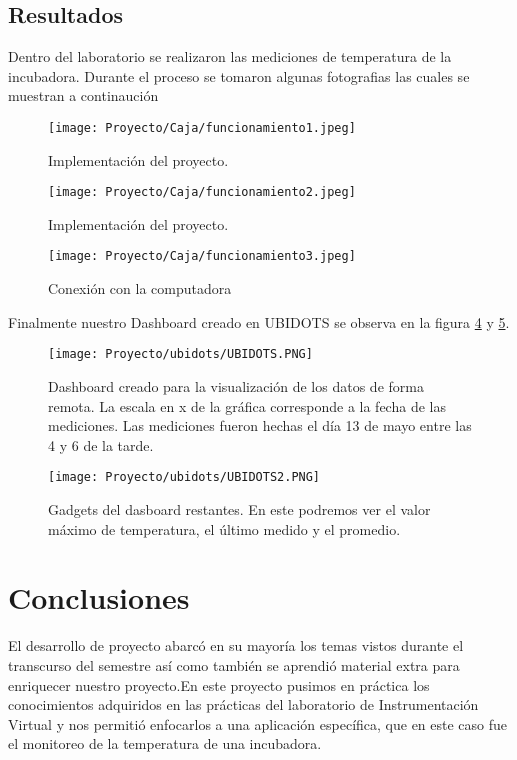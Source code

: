 \subsection{Resultados}

Dentro del laboratorio se realizaron las mediciones de temperatura de la incubadora. Durante el proceso se tomaron algunas fotografias las cuales se muestran  a continaución

\begin{figure}[!h]
\centering
\texttt{[image: Proyecto/Caja/funcionamiento1.jpeg]}
\caption{Implementación del proyecto.}
\label{f1}
\end{figure}


\begin{figure}[!h]
\centering
\texttt{[image: Proyecto/Caja/funcionamiento2.jpeg]}
\caption{Implementación del proyecto.}
\label{f1}
\end{figure}


\begin{figure}[!h]
\centering
\texttt{[image: Proyecto/Caja/funcionamiento3.jpeg]}
\caption{Conexión con la computadora }
\label{f1}
\end{figure}

\clearpage

Finalmente nuestro Dashboard creado en UBIDOTS se observa en la figura \ref{dashboard} y \ref{dashboard2}.

\begin{figure}[!h]
\centering
\texttt{[image: Proyecto/ubidots/UBIDOTS.PNG]}
\caption{Dashboard creado para la visualización de los datos de forma remota. La escala en x  de la gráfica corresponde a la fecha de las mediciones. Las mediciones fueron hechas el día 13 de mayo entre las 4 y 6 de la tarde. }
\label{dashboard}
\end{figure}


\begin{figure}[!h]
\centering
\texttt{[image: Proyecto/ubidots/UBIDOTS2.PNG]}
\caption{Gadgets del dasboard restantes. En este podremos ver el valor máximo de temperatura, el último medido y el promedio.}
\label{dashboard2}
\end{figure}

\section{Conclusiones}

El desarrollo de proyecto abarcó en su mayoría los temas vistos durante el transcurso del semestre así como también se aprendió material extra para enriquecer nuestro proyecto.En este proyecto pusimos en práctica los conocimientos adquiridos en las prácticas del laboratorio de Instrumentación Virtual y nos permitió enfocarlos a una aplicación específica, que en este caso fue el monitoreo de la temperatura de una incubadora.\\

